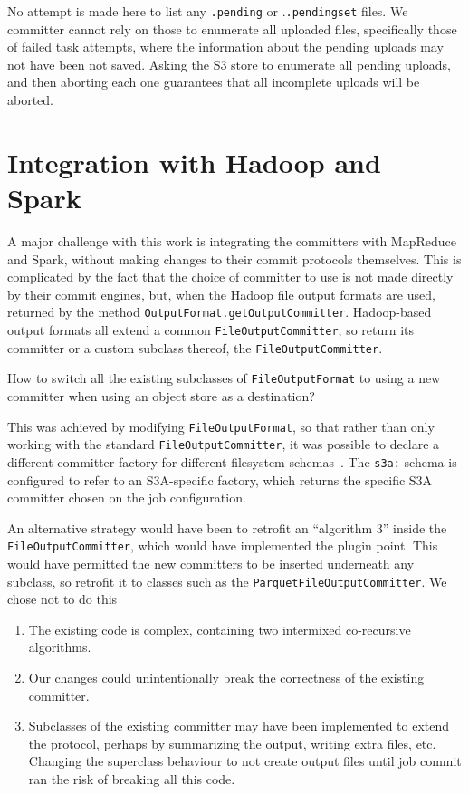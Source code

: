 \documentclass[conference]{IEEEtran}
\begin{document}
No attempt is made here to list any \texttt{.pending} or .\texttt{.pendingset} files.
We committer cannot rely on those to enumerate all uploaded files,
specifically those of failed task attempts, where the information about
the pending uploads may not have been not saved.
Asking the S3 store to enumerate all pending uploads, and then aborting each one
guarantees that all incomplete uploads will be aborted.



\section{Integration with Hadoop and Spark}
\label{sec:integration}

A major challenge with this work is integrating the committers with MapReduce
and Spark, without making changes to their commit protocols themselves.
This is complicated by the fact that the choice of committer to use is
not made directly by their commit engines, but, when the Hadoop file output
formats are used, returned by the method \texttt{OutputFormat.getOutputCommitter}.
Hadoop-based output formats all extend a common \texttt{FileOutputCommitter},
so return its committer or a custom subclass thereof, the  \texttt{FileOutputCommitter}.

How to switch all the existing subclasses of \texttt{FileOutputFormat} to using
a new committer when using an object store as a destination?

This was achieved by modifying \texttt{FileOutputFormat}, so that rather than
only working with the standard \texttt{FileOutputCommitter}, it was possible to declare
a different committer factory for different filesystem schemas\ \cite{MAPREDUCE-6823}.
The \texttt{s3a:} schema is configured to refer to an S3A-specific factory, which
returns the specific S3A committer chosen on the job configuration.

An alternative strategy would have been to retrofit an ``algorithm 3'' inside
the \texttt{FileOutputCommitter}, which would have implemented the plugin point.
This would have permitted the new committers to be inserted underneath any
subclass, so retrofit it to classes such as the \texttt{ParquetFileOutputCommitter}.
We chose not to do this

\begin{enumerate}
  \item The existing code is complex, containing two intermixed co-recursive
  algorithms.
  \item Our changes could unintentionally break the correctness of the existing committer.
  \item Subclasses of the existing committer may have been implemented to extend
  the protocol, perhaps by summarizing the output, writing extra files, etc.
  Changing the superclass behaviour to not create output files until job commit
  ran the risk of breaking all this code.
\end{enumerate}
\end{document}
